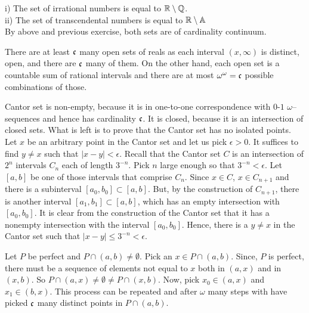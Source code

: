\documentclass[12pt]{article}
\theoremstyle{definition}
\newenvironment{customthm}[1]
  {\renewcommand\theinnercustomthm{#1}\innercustomthm}
  {\endinnercustomthm}
\begin{document}
\begin{customthm}{I.4.5}
    i) The set of irrational numbers is equal to ${\mathbb R} \setminus {\mathbb Q}$.
    \\
    ii) The set of transcendental numbers is equal to ${\mathbb R}\setminus \mathbb{A}$
    \\
    By above and previous exercise, both sets are of cardinality continuum.
\end{customthm}

\begin{customthm}{I.4.6}
    There are at least $\mathfrak{c}$ many open sets of reals as each interval $(x, \infty)$ is distinct, open, and there are $\mathfrak{c}$ many of them. On the other hand, each open set is a countable sum of rational intervals and there are at most $\omega^\omega = \mathfrak{c}$ possible combinations of those.
\end{customthm}

\begin{customthm}{I.4.7}
    Cantor set is non-empty, because it is in one-to-one correspondence with $0$-$1$ $\omega$--sequences and hence has cardinality $\mathfrak{c}$. It is closed, because it is an intersection of closed sets. What is left is to prove that the Cantor set has no isolated points. Let $x$ be an arbitrary point in the Cantor set and let us pick $\epsilon > 0$. It suffices to find $y \neq x$ such that $|x-y|<\epsilon$. Recall that the Cantor set $C$ is an intersection of $2^n$ intervals $C_n$ each of length $3^{-n}$. Pick $n$ large enough so that $3^{-n}<\epsilon$. Let $[a,b]$ be one of those intervals that comprise $C_n$. Since $x \in C$, $x \in C_{n+1}$ and there is a subinterval $[a_0,b_0] \subset [a,b]$. But, by the construction of $C_{n+1}$, there is another interval $[a_1,b_1] \subset [a,b]$, which has an empty intersection with $[a_0,b_0]$. It is clear from the construction of the Cantor set that it has a nonempty intersection with the interval $[a_0,b_0]$. Hence, there is a $y \neq x$ in the Cantor set such that $|x-y| \leq 3^{-n} < \epsilon$.
\end{customthm}

\begin{customthm}{I.4.8}\label{ex:perfect-set-intersected-with-interval-cardinality-continuum}
    Let $P$ be perfect and $P \cap (a,b) \neq \emptyset$. Pick an $x \in P \cap (a,b)$. Since, $P$ is perfect, there must be a sequence of elements not equal to $x$ both in $(a,x)$ and in $(x,b)$. So $P \cap (a,x) \neq \emptyset \neq P \cap (x,b)$. Now, pick $x_0 \in (a,x)$ and $x_1 \in (b,x)$. This process can be repeated and after $\omega$ many steps with have picked $\mathfrak{c}$ many distinct points in $P \cap (a,b)$.
\end{customthm}
\end{document}
